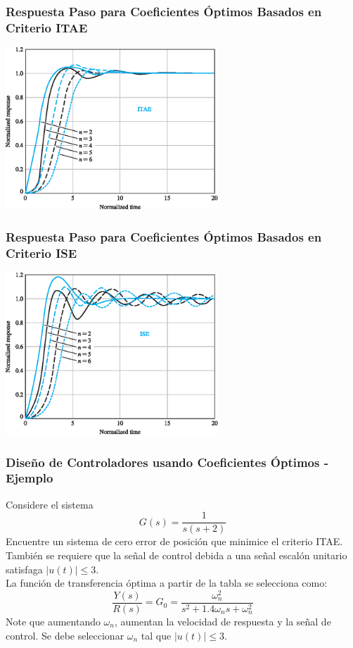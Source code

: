 \documentclass[aspectratio=169,handout]{beamer}
\theoremstyle{definition}
\theoremstyle{plain}
\theoremstyle{remark}
\begin{document}
\begin{frame}[c]\frametitle{Respuesta Paso para Coeficientes Óptimos Basados en Criterio ITAE}
\vspace*{5mm}
\centering
\includegraphics[width=8cm]{images/stepResponseOptimITAE.eps}
\end{frame}

\begin{frame}[c]\frametitle{Respuesta Paso para Coeficientes Óptimos Basados en Criterio ISE}
\vspace*{5mm}
\centering
\includegraphics[width=8cm]{images/stepResponseOptimISE.eps}
\end{frame}

\begin{frame}[<+->]\frametitle{Diseño de Controladores usando Coeficientes Óptimos - Ejemplo}
Considere el sistema
\begin{equation*}
	G(s) = \frac{1}{s(s+2)}
\end{equation*}
Encuentre un sistema de cero error de posición que minimice el criterio ITAE. También se requiere que la señal de control debida a una señal escalón unitario satisfaga $|u(t)| \leq 3$.\\
\vspace*{3mm}
La función de transferencia óptima a partir de la tabla se selecciona como:
\begin{equation*}
	\frac{Y(s)}{R(s)} = G_0 = \frac{\omega_n^2}{s^2 + 1.4 \omega_n s + \omega_n^2}
\end{equation*}
Note que aumentando $\omega_n$, aumentan la velocidad de respuesta y la señal de control. Se debe seleccionar $\omega_n$ tal que $|u(t)| \leq 3$.
\end{frame}
\end{document}
